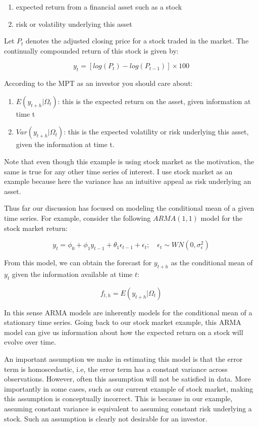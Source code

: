 \documentclass[]{book}
\providecommand{\tightlist}{%
  \setlength{\itemsep}{0pt}\setlength{\parskip}{0pt}}
\theoremstyle{definition}
\theoremstyle{definition}
\theoremstyle{definition}
\theoremstyle{remark}
\begin{document}
\begin{enumerate}
\def\labelenumi{\arabic{enumi}.}
\tightlist
\item
  expected return from a financial asset such as a stock
\item
  risk or volatility underlying this asset
\end{enumerate}

Let \(P_t\) denotes the adjusted closing price for a stock traded in the
market. The continually compounded return of this stock is given by:

\[y_t=[log(P_t)-log(P_{t-1})]\times 100\]

According to the MPT as an investor you should care about:

\begin{enumerate}
\def\labelenumi{\arabic{enumi}.}
\tightlist
\item
  \(E(y_{t+h}|\Omega_t)\): this is the expected return on the asset,
  given information at time t
\item
  \(Var(y_{t+h}|\Omega_t)\): this is the expected volatility or risk
  underlying this asset, given the information at time t.
\end{enumerate}

Note that even though this example is using stock market as the
motivation, the same is true for any other time series of interest. I
use stock market as an example because here the variance has an
intuitive appeal as risk underlying an asset.

Thus far our discussion has focused on modeling the conditional mean of
a given time series. For example, consider the following \(ARMA(1,1)\)
model for the stock market return:

\[y_t=\phi_0 + \phi_1 y_{t-1} + \theta_1 \epsilon_{t-1} + \epsilon_t ; \quad \epsilon_t\sim WN(0, \sigma^2_\epsilon )\]

From this model, we can obtain the forecast for \(y_{t+h}\) as the
conditional mean of \(y_t\) given the information available at time
\(t\):

\[f_{t,h}=E(y_{t+h}|\Omega_t)\]

In this sense ARMA models are inherently models for the conditional mean
of a stationary time series. Going back to our stock market example,
this ARMA model can give us information about how the expected return on
a stock will evolve over time.

An important assumption we make in estimating this model is that the
error term is homoscedastic, i.e, the error term has a constant variance
across observations. However, often this assumption will not be
satisfied in data. More importantly in some cases, such as our current
example of stock market, making this assumption is conceptually
incorrect. This is because in our example, assuming constant variance is
equivalent to assuming constant risk underlying a stock. Such an
assumption is clearly not desirable for an investor.
\end{document}
